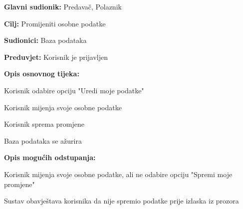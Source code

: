 			\noindent {}
			\begin{packed_item}
				
				\item \textbf{Glavni sudionik:} Predavač, Polaznik
				\item  \textbf{Cilj:} Promijeniti osobne podatke
				\item  \textbf{Sudionici:} Baza podataka
				\item  \textbf{Preduvjet:} Korisnik je prijavljen
				\item  \textbf{Opis osnovnog tijeka:}
				
				\item[] \begin{packed_enum}
					
					\item Korisnik odabire opciju "Uredi moje podatke"
					\item Korisnik mijenja svoje osobne podatke
					\item Korisnik sprema promjene
					\item Baza podataka se ažurira
					
				\end{packed_enum}
				\item  \textbf{Opis mogućih odstupanja:}
				
				\item[] \begin{packed_item}
					
					\item[2.a] Korisnik mijenja svoje osobne podatke, ali ne odabire opciju "Spremi moje promjene"
					\item[] \begin{packed_enum}
						
						\item Sustav obavještava korisnika da nije spremio podatke prije izlaska iz prozora
						
					\end{packed_enum}
					
				\end{packed_item}
				
			\end{packed_item}
			\noindent {}
